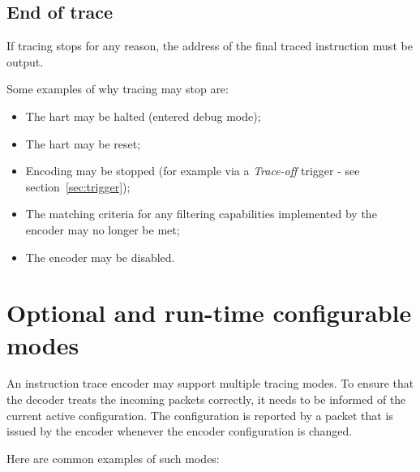 \subsection{End of trace} \label{sec:endoftrace}

If tracing stops for any reason, the address of the final traced instruction must be output.

Some examples of why tracing may stop are: 
\begin{itemize}
  \item The hart may be halted (entered debug mode);
  \item The hart may be reset;
  \item Encoding may be stopped (for example via a \textit{Trace-off} trigger - see section~\ref{sec:trigger});
  \item The matching criteria for any filtering capabilities implemented by the encoder may no longer be met;
  \item The encoder may be disabled.
\end{itemize}

\section{Optional and run-time configurable modes} \label{optional}

An instruction trace encoder may support multiple tracing modes.
To ensure that the decoder treats the incoming packets
correctly, it needs to be informed of the current active configuration.
The configuration is reported by a packet that is issued by the encoder
whenever the encoder configuration is changed.

Here are common examples of such modes:

